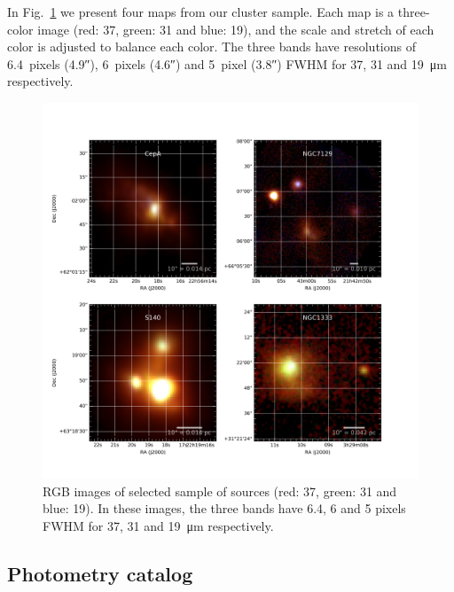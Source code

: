 In Fig.~\ref{fig:varietySources} we present four maps from our cluster sample. Each map is a three-color image (red: \SI{37}{\micron}, green: \SI{31}{\micron} and blue: \SI{19}{\micron}), and the scale and stretch of each color is adjusted to balance each color. The three bands have resolutions of
6.4~pixels (\ang{;;4.9}), 6~pixels (\ang{;;4.6}) and 5~pixel (\ang{;;3.8}) FWHM for 37, 31 and \SI{19}{\um} respectively.

\begin{figure}[!h]
\begin{center}
\includegraphics[width=\textwidth]{Figures/RGBmosaic.png}
\vspace{-1cm}
\caption[RGB images of select sample of sources]{RGB images of selected sample of sources (red: \SI{37}{\micron}, green: \SI{31}{\micron} and blue: \SI{19}{\micron}). In these images, the three bands have 6.4, 6 and 5 pixels FWHM for 37, 31 and \SI{19}{\um} respectively.}
\label{fig:varietySources}
\end{center}
\end{figure}

\subsection{Photometry catalog}

